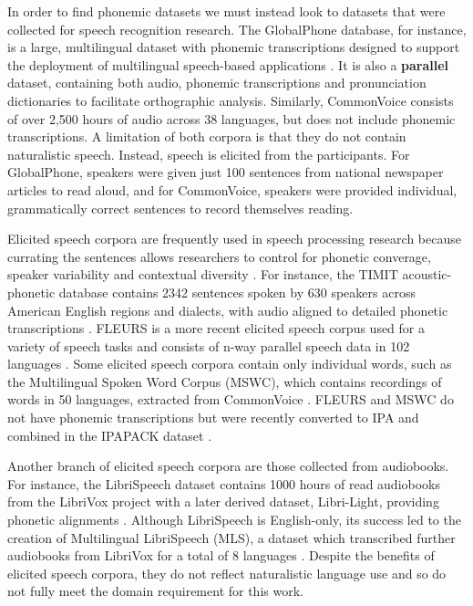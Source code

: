 In order to find phonemic datasets we must instead look to datasets that were collected for speech recognition research. The GlobalPhone database, for instance, is a large, multilingual dataset with phonemic transcriptions designed to support the deployment of multilingual speech-based applications \citep{schultz2002globalphone, schultz2013globalphone}. It is also a \textbf{parallel} dataset, containing both audio, phonemic transcriptions and pronunciation dictionaries to facilitate orthographic analysis. Similarly, CommonVoice \citep{ardila-etal-2020-common} consists of over 2,500 hours of audio across 38 languages, but does not include phonemic transcriptions. A limitation of both corpora is that they do not contain naturalistic speech. Instead, speech is elicited from the participants. For GlobalPhone, speakers were given just 100 sentences from national newspaper articles to read aloud, and for CommonVoice, speakers were provided individual, grammatically correct sentences to record themselves reading.%

Elicited speech corpora are frequently used in speech processing research because currating the sentences allows researchers to control for phonetic converage, speaker variability and contextual diversity \citep{lamel1989speech}. For instance, the TIMIT acoustic-phonetic database contains 2342 sentences spoken by 630 speakers across American English regions and dialects, with audio aligned to detailed phonetic transcriptions \citep{garofolo1993darpa}. FLEURS is a more recent elicited speech corpus used for a variety of speech tasks and consists of n-way parallel speech data in 102 languages \citep{conneau2023fleurs}. Some elicited speech corpora contain only individual words, such as the Multilingual Spoken Word Corpus (MSWC), which contains recordings of words in 50 languages, extracted from CommonVoice \citep{mazumder2021multilingual}. FLEURS and MSWC do not have phonemic transcriptions but were recently converted to IPA and combined in the IPAPACK dataset \citep{zhu-etal-2024-taste}.

Another branch of elicited speech corpora are those collected from audiobooks. For instance, the LibriSpeech dataset contains 1000 hours of read audiobooks from the LibriVox project \citep{panayotov2015librispeech} with a later derived dataset, Libri-Light, providing phonetic alignments \citep{Kahn_2020}. Although LibriSpeech is English-only, its success led to the creation of Multilingual LibriSpeech (MLS), a dataset which transcribed further audiobooks from LibriVox for a total of 8 languages \citep{pratap2020mls}. Despite the benefits of elicited speech corpora, they do not reflect naturalistic language use and so do not fully meet the domain requirement for this work.

